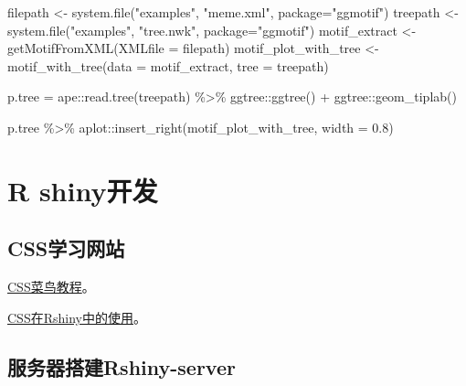 \documentclass[
  10pt,
]{book}
\newenvironment{Shaded}{\begin{snugshade}}{\end{snugshade}}
\newcommand{\AttributeTok}[1]{\textcolor[rgb]{0.77,0.63,0.00}{#1}}
\newcommand{\FloatTok}[1]{\textcolor[rgb]{0.00,0.00,0.81}{#1}}
\newcommand{\FunctionTok}[1]{\textcolor[rgb]{0.00,0.00,0.00}{#1}}
\newcommand{\NormalTok}[1]{#1}
\newcommand{\OtherTok}[1]{\textcolor[rgb]{0.56,0.35,0.01}{#1}}
\newcommand{\SpecialCharTok}[1]{\textcolor[rgb]{0.00,0.00,0.00}{#1}}
\newcommand{\StringTok}[1]{\textcolor[rgb]{0.31,0.60,0.02}{#1}}
\begin{document}
\begin{Shaded}
\begin{Highlighting}[]
\NormalTok{filepath }\OtherTok{\textless{}{-}} \FunctionTok{system.file}\NormalTok{(}\StringTok{"examples"}\NormalTok{, }\StringTok{"meme.xml"}\NormalTok{, }\AttributeTok{package=}\StringTok{"ggmotif"}\NormalTok{)}
\NormalTok{treepath }\OtherTok{\textless{}{-}} \FunctionTok{system.file}\NormalTok{(}\StringTok{"examples"}\NormalTok{, }\StringTok{"tree.nwk"}\NormalTok{, }\AttributeTok{package=}\StringTok{"ggmotif"}\NormalTok{)}
\NormalTok{motif\_extract }\OtherTok{\textless{}{-}} \FunctionTok{getMotifFromXML}\NormalTok{(}\AttributeTok{XMLfile =}\NormalTok{ filepath)}
\NormalTok{motif\_plot\_with\_tree }\OtherTok{\textless{}{-}} \FunctionTok{motif\_with\_tree}\NormalTok{(}\AttributeTok{data =}\NormalTok{ motif\_extract, }\AttributeTok{tree =}\NormalTok{ treepath)}

\NormalTok{p.tree }\OtherTok{=}\NormalTok{ ape}\SpecialCharTok{::}\FunctionTok{read.tree}\NormalTok{(treepath) }\SpecialCharTok{\%\textgreater{}\%} 
\NormalTok{  ggtree}\SpecialCharTok{::}\FunctionTok{ggtree}\NormalTok{() }\SpecialCharTok{+}
\NormalTok{  ggtree}\SpecialCharTok{::}\FunctionTok{geom\_tiplab}\NormalTok{()}

\NormalTok{p.tree  }\SpecialCharTok{\%\textgreater{}\%} 
\NormalTok{  aplot}\SpecialCharTok{::}\FunctionTok{insert\_right}\NormalTok{(motif\_plot\_with\_tree, }\AttributeTok{width =} \FloatTok{0.8}\NormalTok{)}
\end{Highlighting}
\end{Shaded}

\hypertarget{r-shinyux5f00ux53d1}{%
\section{R shiny开发}\label{r-shinyux5f00ux53d1}}

\hypertarget{cssux5b66ux4e60ux7f51ux7ad9}{%
\subsection{CSS学习网站}\label{cssux5b66ux4e60ux7f51ux7ad9}}

\href{https://www.runoob.com/css/css-align.html}{CSS菜鸟教程}。

\href{https://unleash-shiny.rinterface.com/beautify-css.html}{CSS在Rshiny中的使用}。

\hypertarget{ux670dux52a1ux5668ux642dux5efarshiny-server}{%
\subsection{服务器搭建Rshiny-server}\label{ux670dux52a1ux5668ux642dux5efarshiny-server}}
\end{document}
